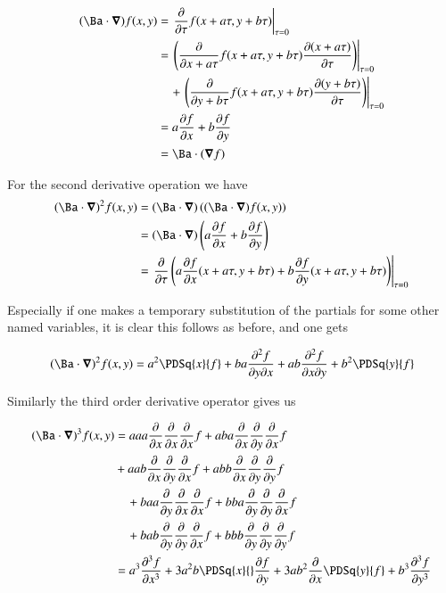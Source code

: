 \begin{align*}
(\Ba \cdot \spacegrad) f(x,y) 
&= \left. \PD{\tau}{} f(x + a\tau, y + b\tau) \right\vert_{\tau=0} \\
&= 
\left. \left( \PD{x + a\tau}{} f(x + a\tau, y + b\tau) \PD{\tau}{(x + a\tau)} \right) \right\vert_{\tau=0} \\
&\quad+\left. \left( \PD{y + b\tau}{} f(x + a\tau, y + b\tau) \PD{\tau}{(y + b\tau)} \right) \right\vert_{\tau=0} \\
&= 
a \PD{x}{f} +b \PD{y}{f} \\
&= 
\Ba \cdot (\spacegrad f)
\end{align*}

For the second derivative operation we have
\begin{align*}
(\Ba \cdot \spacegrad)^2 f(x,y) 
&=
(\Ba \cdot \spacegrad) 
\left( (\Ba \cdot \spacegrad) f(x,y) \right) \\
&=
(\Ba \cdot \spacegrad) \left( a \PD{x}{f} +b \PD{y}{f} \right) \\
&= \left. \PD{\tau}{} \left( a \PD{x}{f}(x + a\tau, y + b\tau) + b \PD{y}{f}(x + a\tau, y + b\tau) \right) \right\vert_{\tau=0} \\
\end{align*}

Especially if one makes a temporary substitution of the partials for some other named variables, it is clear this follows as 
before, and one gets

\begin{align*}
(\Ba \cdot \spacegrad)^2 f(x,y) 
&=
a^2 \PDSq{x}{f} + b a \PDD{y}{x}{f} 
+a b \PDD{x}{y}{f} + b^2 \PDSq{y}{f} \\
\end{align*}

Similarly the third order derivative operator gives us

\begin{align*}
(\Ba \cdot \spacegrad)^3 f(x,y) 
&=
a a a \PD{x}{}\PD{x}{}\PD{x}{} f + a b a \PD{x}{}\PD{y}{}\PD{x}{}{f}  \\
\quad&+a a b \PD{x}{}\PD{y}{}\PD{x}{} f + a b b \PD{x}{}\PD{y}{}\PD{y}{}{f} \\
&\quad+b a a \PD{y}{}\PD{x}{}\PD{x}{} f + b b a \PD{y}{}\PD{y}{}\PD{x}{}{f} \\
&\quad+b a b \PD{y}{}\PD{y}{}\PD{x}{} f + b b b \PD{y}{}\PD{y}{}\PD{y}{}{f} \\
&=
a^3 \frac{\partial^3 f}{\partial x^3} 
+ 3 a^2 b \PDSq{x}{}\PD{y}{f}
+ 3 a b^2 \PD{x}{}\PDSq{y}{f} 
+b^3 \frac{\partial^3 f}{\partial y^3} 
\end{align*}

